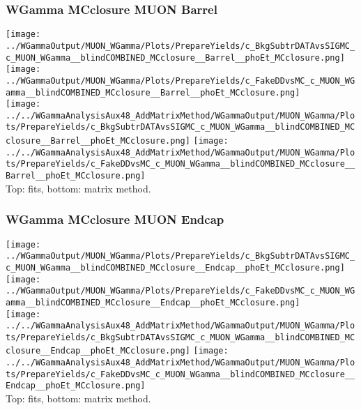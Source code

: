 \documentclass{beamer}
\begin{document}
\begin{frame}\frametitle{WGamma MCclosure MUON Barrel}
  \texttt{[image: ../WGammaOutput/MUON\_WGamma/Plots/PrepareYields/c\_BkgSubtrDATAvsSIGMC\_c\_MUON\_WGamma\_\_blindCOMBINED\_MCclosure\_\_Barrel\_\_phoEt\_MCclosure.png]} \texttt{[image: ../WGammaOutput/MUON\_WGamma/Plots/PrepareYields/c\_FakeDDvsMC\_c\_MUON\_WGamma\_\_blindCOMBINED\_MCclosure\_\_Barrel\_\_phoEt\_MCclosure.png]}\\
  \texttt{[image: ../../WGammaAnalysisAux48\_AddMatrixMethod/WGammaOutput/MUON\_WGamma/Plots/PrepareYields/c\_BkgSubtrDATAvsSIGMC\_c\_MUON\_WGamma\_\_blindCOMBINED\_MCclosure\_\_Barrel\_\_phoEt\_MCclosure.png]} \texttt{[image: ../../WGammaAnalysisAux48\_AddMatrixMethod/WGammaOutput/MUON\_WGamma/Plots/PrepareYields/c\_FakeDDvsMC\_c\_MUON\_WGamma\_\_blindCOMBINED\_MCclosure\_\_Barrel\_\_phoEt\_MCclosure.png]}\\
  \scriptsize Top: fits, bottom: matrix method.
\end{frame}

\begin{frame}\frametitle{WGamma MCclosure MUON Endcap}
  \texttt{[image: ../WGammaOutput/MUON\_WGamma/Plots/PrepareYields/c\_BkgSubtrDATAvsSIGMC\_c\_MUON\_WGamma\_\_blindCOMBINED\_MCclosure\_\_Endcap\_\_phoEt\_MCclosure.png]} \texttt{[image: ../WGammaOutput/MUON\_WGamma/Plots/PrepareYields/c\_FakeDDvsMC\_c\_MUON\_WGamma\_\_blindCOMBINED\_MCclosure\_\_Endcap\_\_phoEt\_MCclosure.png]}\\
  \texttt{[image: ../../WGammaAnalysisAux48\_AddMatrixMethod/WGammaOutput/MUON\_WGamma/Plots/PrepareYields/c\_BkgSubtrDATAvsSIGMC\_c\_MUON\_WGamma\_\_blindCOMBINED\_MCclosure\_\_Endcap\_\_phoEt\_MCclosure.png]} \texttt{[image: ../../WGammaAnalysisAux48\_AddMatrixMethod/WGammaOutput/MUON\_WGamma/Plots/PrepareYields/c\_FakeDDvsMC\_c\_MUON\_WGamma\_\_blindCOMBINED\_MCclosure\_\_Endcap\_\_phoEt\_MCclosure.png]}\\
  \scriptsize Top: fits, bottom: matrix method.
\end{frame}
\end{document}
